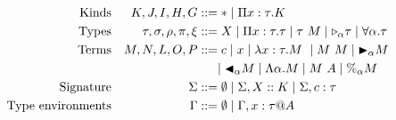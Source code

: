 \begin{align*}
    \textrm{Kinds}             &  & K,J,I,H,G                & ::= * \mid \Pi x:\tau.K                                                           \\
    \textrm{Types}             &  & \tau,\sigma,\rho,\pi,\xi & ::= X \mid \Pi x:\tau.\tau \mid \tau\ M \mid {\mathop{\triangleright}}_{\alpha} \tau \mid \forall\alpha.\tau \\
    \textrm{Terms}             &  & M,N,L,O,P                & ::= c \mid x \mid \lambda x:\tau.M\ \mid M\ M \mid {\mathop{\blacktriangleright}}_\alpha M                   \\
                               &  &                          & \ \ \ \ \mid {\mathop{\blacktriangleleft}}_\alpha M \mid \Lambda\alpha.M \mid M\ A \mid \%_\alpha M        \\
    \textrm{Signature}         &  & \Sigma                   & ::= \emptyset \mid \Sigma, X::K \mid \Sigma, c:\tau                               \\
    \textrm{Type environments} &  & \Gamma                   & ::= \emptyset \mid  \Gamma,x:\tau @A                                              \\
\end{align*}



